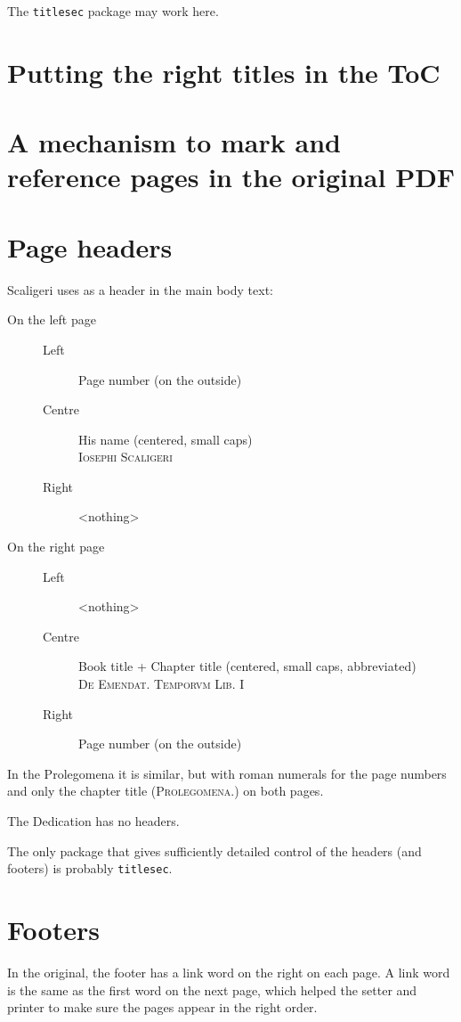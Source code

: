 \documentclass{report}
\begin{document}
The \texttt{titlesec} package may work here.

\section{Putting the right titles in the ToC}

\section{A mechanism to mark and reference pages in the original PDF}

\section{Page headers}
Scaligeri uses as a header in the main body text:
\begin{description}
\item[On the left page] \hfill
    \begin{description}
    \item[Left] Page number (on the outside)
    \item[Centre] His name (centered, small caps) \\
      \textsc{Iosephi Scaligeri}
    \item[Right] <nothing>
    \end{description}
\item[On the right page] \hfill
    \begin{description}
    \item[Left] <nothing>
    \item[Centre] Book title + Chapter title (centered, small caps, abbreviated) \\
       \textsc{De Emendat. Temporvm Lib. I}
    \item[Right] Page number (on the outside)
    \end{description}
\end{description}

In the Prolegomena it is similar, but with roman numerals for the page numbers and only the chapter title
\textsc{(Prolegomena.)} on both pages. 

The Dedication has no headers.

The only package that gives sufficiently detailed control of the headers (and footers) is probably \texttt{titlesec}.

\section{Footers}
In the original, the footer has a link word on the right on each page. A link word is the same as the first word on the
next page, which helped the setter and printer to make sure the pages appear in the right order.
\end{document}
